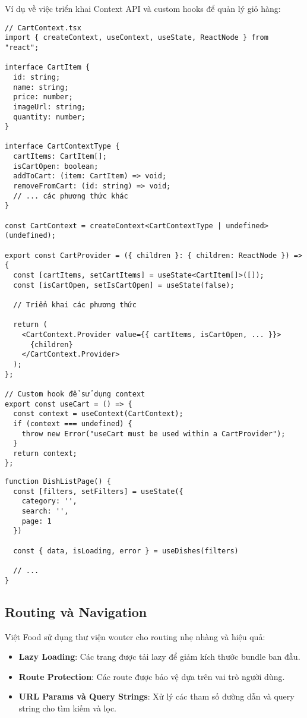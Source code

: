 Ví dụ về việc triển khai Context API và custom hooks để quản lý giỏ hàng:

\begin{verbatim}
// CartContext.tsx
import { createContext, useContext, useState, ReactNode } from "react";

interface CartItem {
  id: string;
  name: string;
  price: number;
  imageUrl: string;
  quantity: number;
}

interface CartContextType {
  cartItems: CartItem[];
  isCartOpen: boolean;
  addToCart: (item: CartItem) => void;
  removeFromCart: (id: string) => void;
  // ... các phương thức khác
}

const CartContext = createContext<CartContextType | undefined>(undefined);

export const CartProvider = ({ children }: { children: ReactNode }) => {
  const [cartItems, setCartItems] = useState<CartItem[]>([]);
  const [isCartOpen, setIsCartOpen] = useState(false);
  
  // Triển khai các phương thức
  
  return (
    <CartContext.Provider value={{ cartItems, isCartOpen, ... }}>
      {children}
    </CartContext.Provider>
  );
};

// Custom hook để sử dụng context
export const useCart = () => {
  const context = useContext(CartContext);
  if (context === undefined) {
    throw new Error("useCart must be used within a CartProvider");
  }
  return context;
};
\end{verbatim}

\begin{verbatim}
function DishListPage() {
  const [filters, setFilters] = useState({
    category: '',
    search: '',
    page: 1
  })
  
  const { data, isLoading, error } = useDishes(filters)
  
  // ...
}
\end{verbatim}

\subsection{Routing và Navigation}

Việt Food sử dụng thư viện wouter cho routing nhẹ nhàng và hiệu quả:

\begin{itemize}
    \item \textbf{Lazy Loading}: Các trang được tải lazy để giảm kích thước bundle ban đầu.
    \item \textbf{Route Protection}: Các route được bảo vệ dựa trên vai trò người dùng.
    \item \textbf{URL Params và Query Strings}: Xử lý các tham số đường dẫn và query string cho tìm kiếm và lọc.
\end{itemize}

